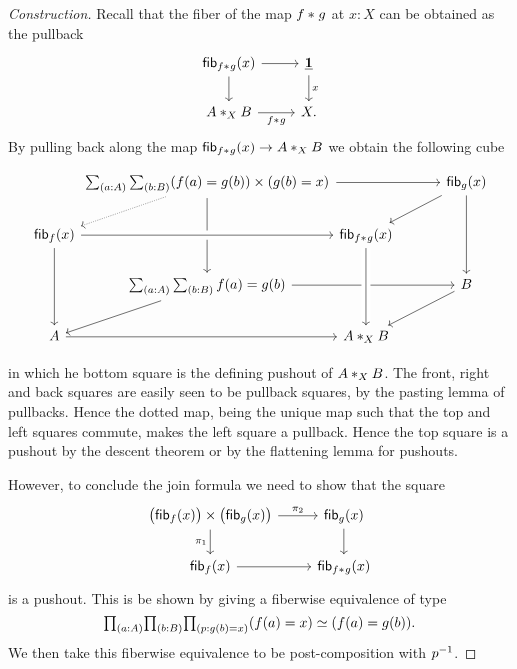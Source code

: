 \begin{proof}[Construction]
Recall that the fiber of the map $\join{f}{g}$ at $x:X$ can be obtained as
the pullback
\begin{equation*}
\begin{tikzcd}
\fib{\join{f}{g}}{x} \arrow[r] \arrow[d] & \unit \arrow[d,"x"] \\
\join[X]{A}{B} \arrow[r,swap,"\join{f}{g}"] & X.
\end{tikzcd}
\end{equation*}
By pulling back along the map $\fib{\join{f}{g}}{x}\to \join[X]{A}{B}$ we
obtain the following cube
\begin{small}
\begin{equation*}
\begin{tikzcd}[column sep=3em]
& \makebox[5em]{$\sm{a:A}{b:B}(f(a)=g(b))\times (g(b)=x)$} \arrow[rr,start anchor={[xshift=6.3em]}] \arrow[dl,densely dotted] \arrow[dd] 
  & & \fib{g}{x} \arrow[dd] \arrow[dl] \\
\fib{f}{x} \arrow[rr,crossing over] \arrow[dd] & & \fib{\join{f}{g}}{x} \\
  & \sm{a:A}{b:B}f(a)=g(b) \arrow[dl] \arrow[rr] & & B \arrow[dl] \\
A \arrow[rr] & & \join[X]{A}{B} \arrow[from=uu,crossing over]
\end{tikzcd}
\end{equation*}
\end{small}%
in which he bottom square is the defining pushout of $\join[X]{A}{B}$. 
The front, right and back squares are easily seen to be pullback squares, by the pasting lemma of pullbacks. Hence the dotted map, being the unique map such that the top and left squares commute, makes the left square a pullback. Hence the top square is a pushout by the descent theorem or by the flattening lemma for pushouts.

However, to conclude the join formula we need to show that the square
\begin{equation*}
\begin{tikzcd}
\big(\fib{f}{x}\big)\times\big(\fib{g}{x}\big) \arrow[r,"\pi_2"] \arrow[d,swap,"\pi_1"] & \fib{g}{x} \arrow[d] \\
\fib{f}{x} \arrow[r] & \fib{\join{f}{g}}{x}
\end{tikzcd}
\end{equation*}
is a pushout. This is be shown by giving a fiberwise equivalence of type
\begin{equation*}
\prd{a:A}{b:B}{p:g(b)=x} \eqv{(f(a)=x)}{(f(a)=g(b))}.
\end{equation*}
We then take this fiberwise equivalence to be post-composition with $\opp{p}$. 
\end{proof}

